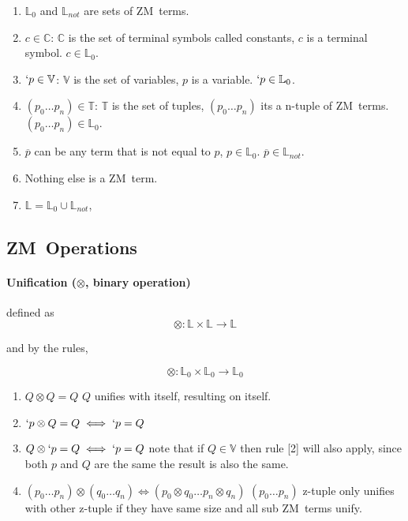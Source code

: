 \documentclass[11pt,a4paper]{report}
\newcommand{\zm}{ZM}
\newcommand{\var}[1]{`#1}
\newcommand{\unify}{\otimes}
\begin{document}
\begin{enumerate}
\item $\mathbb{L}_{0}$ and $\mathbb{L}_{not}$ are sets of \zm\ terms.
\item $c \in \mathbb{C}$: $\mathbb{C}$ is the set of terminal symbols called constants, $c$ is a terminal symbol. $c \in \mathbb{L}_{0}$.
\item $\var{p} \in \mathbb{V}$: $\mathbb{V}$ is the set of variables, $p$ is a variable. $\var{p} \in \mathbb{L}_{0}$.
\item $(p_{0} \ldots p_{n}) \in \mathbb{T}$: $\mathbb{T}$ is the set of tuples, $(p_{0} \ldots p_{n})$ its a n-tuple of \zm\ terms. $(p_{0} \ldots p_{n}) \in \mathbb{L}_{0}$.
\item $\overline{p}$ can be any term that is not equal to $p$, $p \in \mathbb{L}_{0}$. $\overline{p} \in \mathbb{L}_{not}$. 
\item Nothing else is a \zm\ term.
\item $\mathbb{L} = \mathbb{L}_{0} \cup \mathbb{L}_{not}$,
\end{enumerate}


\subsection{\zm\ Operations}

\paragraph{Unification ($\unify$, binary operation)} defined as 
\[
    \unify: \mathbb{L} \times \mathbb{L} \rightarrow \mathbb{L}
\] 

and by the rules,

\[
    \unify: \mathbb{L}_{0} \times \mathbb{L}_{0} \rightarrow \mathbb{L}_{0} 
\]

\begin{enumerate}
\item $Q \unify Q = Q$
    \subitem $Q$ unifies with itself, resulting on itself.

\item $\var{p} \unify Q = Q \iff \var{p} = Q$
\item $Q \unify \var{p} = Q \iff \var{p} = Q$
    \subitem note that if $Q \in \mathbb{V}$ then rule [2] will also apply, since both $p$ and $Q$ are the same the result is also the same. 

\item $(p_{0} \ldots p_{n}) \unify (q_{0} \ldots q_{n}) \iff (p_{0} \unify q_{0} \ldots p_{n} \unify q_{n})$
    \subitem $(p_{0} \ldots p_{n})$ z-tuple only unifies with other z-tuple if they have same size and all sub \zm\ terms unify.
    
\end{enumerate}
\end{document}
